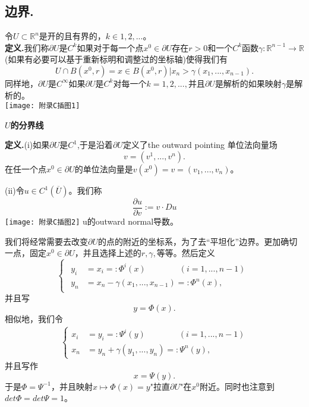 \documentclass[leqno]{article}%
\begin{document}
\subsection{边界.}
令$U\subset \mathbb{R}^{n}$是开的且有界的，$k\in{1,2,...}$。\\
\textbf{定义.}我们称$\partial U$是$C^{k}$如果对于每一个点$x^{0}\in\partial U$存在$r>0$和一个$C^{k}$函数$\gamma:\mathbb{R}^{n-1}\rightarrow\mathbb{R}$(如果有必要可以基于重新标明和调整过的坐标轴)使得我们有
\begin{equation*}
U\cap B(x^{0},r)={x\in B(x^{0},r)|x_{n}>\gamma(x_{1},...,x_{n-1})}.
\end{equation*}
同样地，$\partial U$是$C^{\infty}$如果$\partial U$是$C^{k}$对每一个$k=1,2,...,$并且$\partial U$是解析的如果映射$\gamma$是解析的。\\
\texttt{[image: 附录C插图1]}
\begin{center}
	\textbf{$U$的分界线}
\end{center} 
\textbf{定义.}(i)如果$\partial U$是$C^{1}$,于是沿着$\partial U$定义了the outward pointing 单位法向量场
\begin{equation*}
v=(v^{1},...,v^{n}).
\end{equation*}
在任一个点$x^{0}\in\partial U$的单位法向量是$v(x^{0})=v=(v_{1},...,v_{n})$。\par
(ii)令$u\in C^{1}\left(\overline{U}\right)$。我们称
\begin{equation*}
\frac{\partial u}{\partial v}:=v\cdot Du
\end{equation*}
\texttt{[image: 附录C插图2]}
u的outward normal导数。\par
我们将经常需要去改变$\partial U$的点的附近的坐标系，为了去“平坦化”边界。更加确切一点，固定$x^{0}\in\partial U$，并且选择上述的$r,\gamma,$等等。然后定义
\begin{equation*}
\begin{cases}
\begin{aligned}
y_{i}&\!=x_{i}=:\Phi^{i}(x)\qquad \qquad (i=1,...,n-1)\\
y_{n}&\!=x_{n}-\gamma(x_{1},...,x_{n-1})=:\Phi^{n}(x),
\end{aligned}
\end{cases}
\end{equation*}
并且写
\begin{equation*}
y=\Phi(x).
\end{equation*}
相似地，我们令
\begin{equation*}
\begin{aligned}
\begin{cases}
x_{i}&=y_{i}=:\Psi^{i}(y)\qquad \qquad (i=1,...,n-1)\\
x_{n}&=y_{n}+\gamma(y_{1},...,y_{n})=:\Psi^{n}(y),
\end{cases}
\end{aligned}
\end{equation*}
并且写作
\begin{equation*}
x=\Psi(y).
\end{equation*}
于是$\Phi=\Psi^{-1}$，并且映射$x\mapsto\Phi(x)=y$"拉直$\partial U$"在$x^{0}$附近。同时也注意到$det\Phi=det\Psi=1$。
\end{document}
